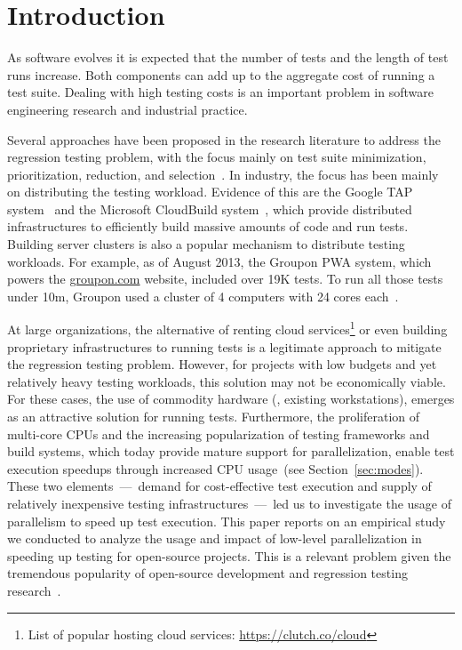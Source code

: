 \section{Introduction}
\label{sec:intro}


As software evolves it is expected that the number of tests and the
length of test runs increase.  Both components can add up to the
aggregate cost of running a test suite.  Dealing with high testing
costs is an important problem in software engineering research and
industrial practice.

Several approaches have been proposed in the research literature to
address the regression testing problem, with the focus mainly on test
suite minimization, prioritization, reduction, and
selection~\cite{yoo-harman-stvr2012}.  In industry, the focus has been
mainly on distributing the testing workload.  Evidence of this are the
Google TAP system~\cite{google-tap,google-ci} and the Microsoft
CloudBuild system~\cite{prasad-shulte-ieee-microsoft-ci}, which
provide distributed infrastructures to efficiently build massive
amounts of code and run tests.  Building server clusters is also a
popular mechanism to distribute testing workloads.  For example, as of
August 2013, the Groupon PWA system, which powers the
\url{groupon.com} website, included over 19K tests.  To run all those
tests under 10m, Groupon used a cluster of 4 computers with 24 cores
each~\cite{kim-etal-fse2013}.

At large organizations, the alternative of renting cloud
services\footnote{List of popular hosting cloud services:
  \url{https://clutch.co/cloud}} or even building proprietary
infrastructures to running tests is a legitimate approach to mitigate
the regression testing problem.  However, for projects with low
budgets and yet relatively heavy testing workloads, this solution may
not be economically viable.  For these cases, the use of commodity
hardware (\eg{}, existing workstations), emerges as an attractive
solution for running tests.  Furthermore, the proliferation of
multi-core CPUs and the increasing popularization of testing
frameworks and build systems, which today provide mature support for
parallelization, enable test execution speedups through increased CPU
usage~(see Section~\ref{sec:modes}).  These two elements~---~demand
for cost-effective test execution and supply of relatively inexpensive
testing infrastructures~---~led us to investigate the usage of
parallelism to speed up test execution.  This paper reports on an
empirical study we conducted to analyze the usage and impact of
low-level parallelization in speeding up testing for open-source
projects.  This is a relevant problem given the tremendous popularity
of open-source development and regression testing
research~\cite{yoo-harman-stvr2012}.

